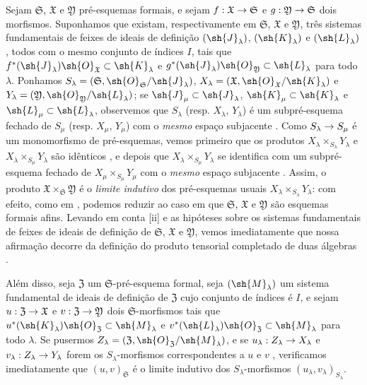 \documentclass[oneside]{amsart}
\makeatletter
\newcommand{\ega@arrow}[2]{\mathchoice{#1}{#2}{#2}{#2}}
\renewcommand{\to}{\ega@arrow{\longrightarrow}{\rightarrow}}
\newcommand{\oldpage}[2][]{{\marginnote{\normalfont\textbf{#1}~|~#2}}\ignorespaces}
\let\EGAOriginalLabel\label
\renewcommand{\label}[1]{\phantomsection\EGAOriginalLabel{#1}}
\makeatother
\begin{document}
\begin{env}[10.7.4]
\label{I.10.7.4}
Sejam $\mathfrak{S}$, $\mathfrak{X}$ e $\mathfrak{Y}$ pré-esquemas formais, e sejam $f:\mathfrak{X}\to\mathfrak{S}$ e $g:\mathfrak{Y}\to\mathfrak{S}$ dois morfismos.
Suponhamos que existam, respectivamente em $\mathfrak{S}$, $\mathfrak{X}$ e $\mathfrak{Y}$, três sistemas fundamentais de feixes de ideais de definição $(\sh{J}_\lambda)$, $(\sh{K}_\lambda)$ e $(\sh{L}_\lambda)$, todos com o mesmo conjunto de índices $I$, tais que $f^*(\sh{J}_\lambda)\sh{O}_\mathfrak{X}\subset\sh{K}_\lambda$ e $g^*(\sh{J}_\lambda)\sh{O}_\mathfrak{Y}\subset\sh{L}_\lambda$ para todo $\lambda$.
Ponhamos $S_\lambda=(\mathfrak{S},\sh{O}_\mathfrak{S}/\sh{J}_\lambda)$, $X_\lambda=(\mathfrak{X},\sh{O}_\mathfrak{X}/\sh{K}_\lambda)$ e $Y_\lambda=(\mathfrak{Y},\sh{O}_\mathfrak{Y}/\sh{L}_\lambda)$; se $\sh{J}_\mu\subset\sh{J}_\lambda$, $\sh{K}_\mu\subset\sh{K}_\lambda$ e $\sh{L}_\mu\subset\sh{L}_\lambda$, observemos que $S_\lambda$ (resp. $X_\lambda$, $Y_\lambda$) é um subpré-esquema fechado de $S_\mu$ (resp. $X_\mu$, $Y_\mu$) com o \emph{mesmo}
\oldpage[I]{194}
espaço subjacente .
Como $S_\lambda\to S_\mu$ é um monomorfismo de pré-esquemas, vemos primeiro que os produtos $X_\lambda\times_{S_\lambda}Y_\lambda$ e $X_\lambda\times_{S_\mu}Y_\lambda$ são idênticos , e depois que $X_\lambda\times_{S_\mu}Y_\lambda$ se identifica com um subpré-esquema fechado de $X_\mu\times_{S_\mu}Y_\mu$ com o \emph{mesmo} espaço subjacente .
Assim, o produto $\mathfrak{X}\times_\mathfrak{S}\mathfrak{Y}$ é o \emph{limite indutivo} dos pré-esquemas usuais $X_\lambda\times_{S_\lambda}Y_\lambda$: com efeito, como em , podemos reduzir ao caso em que $\mathfrak{S}$, $\mathfrak{X}$ e $\mathfrak{Y}$ são esquemas formais afins.
Levando em conta [ii] e as hipóteses sobre os sistemas fundamentais de feixes de ideais de definição de $\mathfrak{S}$, $\mathfrak{X}$ e $\mathfrak{Y}$, vemos imediatamente que nossa afirmação decorre da definição do produto tensorial completado de duas álgebras .

Além disso, seja $\mathfrak{Z}$ um $\mathfrak{S}$-pré-esquema formal, seja $(\sh{M}_\lambda)$ um sistema fundamental de ideais de definição de $\mathfrak{Z}$ cujo conjunto de índices é $I$, e sejam $u:\mathfrak{Z}\to\mathfrak{X}$ e $v:\mathfrak{Z}\to\mathfrak{Y}$ dois $\mathfrak{S}$-morfismos tais que $u^*(\sh{K}_\lambda)\sh{O}_\mathfrak{Z}\subset\sh{M}_\lambda$ e $v^*(\sh{L}_\lambda)\sh{O}_\mathfrak{Z}\subset\sh{M}_\lambda$ para todo $\lambda$.
Se pusermos $Z_\lambda=(\mathfrak{Z},\sh{O}_\mathfrak{Z}/\sh{M}_\lambda)$, e se $u_\lambda:Z_\lambda\to X_\lambda$ e $v_\lambda:Z_\lambda\to Y_\lambda$ forem os $S_\lambda$-morfismos correspondentes a $u$ e $v$ , verificamos imediatamente que $(u,v)_\mathfrak{S}$ é o limite indutivo dos $S_\lambda$-morfismos $(u_\lambda,v_\lambda)_{S_\lambda}$.


\end{env}
\end{document}
